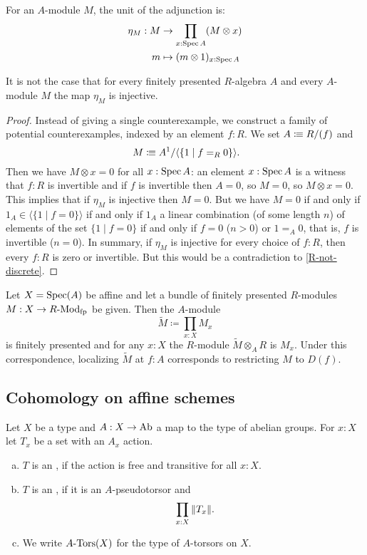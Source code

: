 For an $A$-module $M$,
the unit of the adjunction is:
\begin{align*}
  \eta_M : M &\to \prod_{x : \operatorname{Spec} A} (M \otimes x) \\
  m &\mapsto (m \otimes 1)_{x : \operatorname{Spec} A}
\end{align*}

\begin{example}
  It is not the case that
  for every finitely presented $R$-algebra $A$
  and every $A$-module $M$
  the map $\eta_M$ is injective.
\end{example}

\begin{proof}
  Instead of giving a single counterexample,
  we construct a family of potential counterexamples,
  indexed by an element $f : R$.
  We set $A \vcentcolon\mspace{-1.2mu}\equiv R/(f)$ and
  \[ M \colonequiv A^1 / \langle \{ 1 \mid f =_R 0 \} \rangle \rlap{.} \]
  Then we have $M \otimes x = 0$ for all $x : \operatorname{Spec} A$:
  an element $x : \operatorname{Spec} A$ is a witness that $f : R$ is invertible
  and if $f$ is invertible then $A = 0$, so $M = 0$, so $M \otimes x = 0$.
  This implies that
  if $\eta_M$ is injective
  then $M = 0$.
  But we have $M = 0$ if and only if
  $1_A \in \langle \{ 1 \mid f = 0 \} \rangle$
  if and only if
  $1_A$ a linear combination (of some length $n$)
  of elements of the set $\{ 1 \mid f = 0 \}$
  if and only if
  $f = 0$ ($n > 0$) or
  $1 =_A 0$, that is, $f$ is invertible ($n = 0$).
  In summary,
  if $\eta_M$ is injective for every choice of $f : R$,
  then every $f : R$ is zero or invertible.
  But this would be a contradiction to \cref{R-not-discrete}.
\end{proof}

\begin{theorem}%
  \label{fp-module}
  Let $X=\operatorname{Spec}(A)$ be affine and
  let a bundle of finitely presented $R$-modules $M : X\to R\text{-}\mathrm{Mod}_{\text{fp}}$ be given.
  Then the $A$-module
  \[ \tilde{M}\coloneqq\prod_{x:X}M_x \]
  is finitely presented and for any $x:X$ the $R$-module $\tilde{M}\otimes_A R$ is $M_x$.
  Under this correspondence, localizing $\tilde{M}$ at $f:A$ corresponds to restricting $M$ to $D(f)$.
\end{theorem}

\subsection{Cohomology on affine schemes}

\begin{definition}%
  \label{torsor}
  Let $X$ be a type and $A:X\to \operatorname{Ab}$ a map to the type of abelian groups.
  For $x:X$ let $T_x$ be a set with an $A_x$ action.
  \begin{enumerate}[(a)]
  \item $T$ is an , if the action is free and transitive for all $x:X$.
  \item $T$ is an , if it is an $A$-pseudotorsor and
    \[ \prod_{x:X} \| T_x \| \rlap{.}\]
  \item We write $A\text{-}\mathrm{Tors}(X)$ for the type of $A$-torsors on $X$.
  \end{enumerate}
\end{definition}

